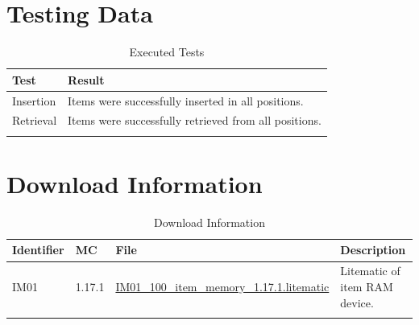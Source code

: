 \documentclass[10pt]{datasheet}
\begin{document}
\section{Testing Data}

\begin{table}[h]
\caption{Executed Tests}
\begin{tabularx}{\textwidth}{l | X}
    \thickhline
    \textbf{Test} & \textbf{Result} \\
    \hline
    Insertion & Items were successfully inserted in all positions. \\
    \hline
    Retrieval & Items were successfully retrieved from all positions. \\
    \thickhline
\end{tabularx}
\end{table}

\section{Download Information}
\begin{table}[h]
    \caption{Download Information}
    \begin{tabularx}{\textwidth}{l | l | l | X}
        \thickhline
        \textbf{Identifier} & \textbf{MC} & \textbf{File} & \textbf{Description} \\
        \hline
        IM01 & 1.17.1 & \href{https://github.com/Soontech-Annals/Archive/blob/b56572c0d2b4f182d9e9d41449d8cb2963b923ae/Archive/item-memory/IM01\%20100\%20Item\%20RAM/IM01\_100\_item\_memory\_1.17.1.litematic?raw=1}{IM01\_100\_item\_memory\_1.17.1.litematic} & Litematic of item RAM device. \\
        \thickhline
    \end{tabularx}
\end{table}
\end{document}
